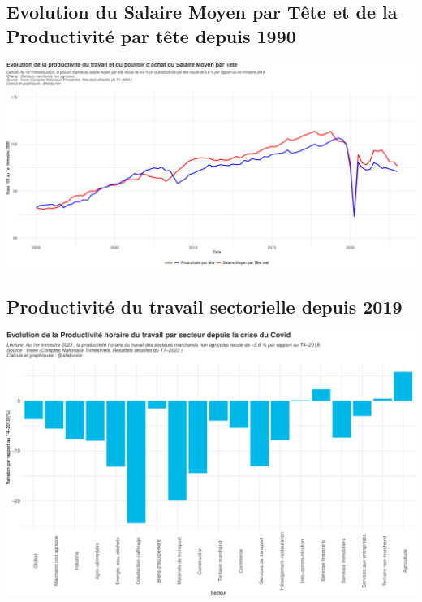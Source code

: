 \documentclass[
  paper=a4,
  ,captions=tableheading
]{scrartcl}
\begin{document}
\hypertarget{evolution-du-salaire-moyen-par-tuxeate-et-de-la-productivituxe9-par-tuxeate-depuis-1990}{%
\subsection{Evolution du Salaire Moyen par Tête et de la Productivité
par tête depuis
1990}\label{evolution-du-salaire-moyen-par-tuxeate-et-de-la-productivituxe9-par-tuxeate-depuis-1990}}

\includegraphics{rapport_pdf_compte_branche_files/figure-latex/unnamed-chunk-22-1.pdf}

\newpage

\hypertarget{productivituxe9-du-travail-sectorielle-depuis-2019}{%
\subsection{Productivité du travail sectorielle depuis
2019}\label{productivituxe9-du-travail-sectorielle-depuis-2019}}

\includegraphics{rapport_pdf_compte_branche_files/figure-latex/unnamed-chunk-23-1.pdf}
\end{document}
